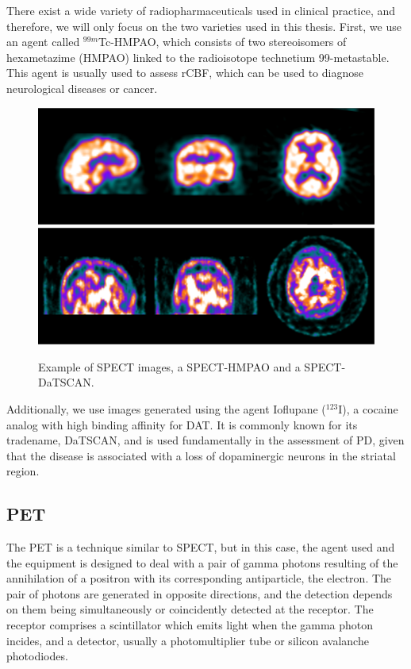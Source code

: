 There exist a wide variety of radiopharmaceuticals used in clinical practice, and therefore, we will only focus on the two varieties used in this thesis. First, we use an agent called $^{99m}$Tc-HMPAO, which consists of two stereoisomers of hexametazime (HMPAO) linked to the radioisotope technetium 99-metastable. This agent is usually used to assess \ac{rCBF}, which can be used to diagnose neurological diseases or cancer. 

\begin{figure}[p]
	\centering
	\includegraphics[width=0.8\linewidth]{Graphics/ch2/example_SPECT}\\
	\includegraphics[width=0.8\linewidth]{Graphics/ch2/example_DaTSCAN}
	\caption[Example of \acs{SPECT} images.]{Example of \acs{SPECT} images, a \acs{SPECT}-HMPAO and a \acs{SPECT}-DaTSCAN.}
	\label{fig:example_SPECT}
\end{figure}

Additionally, we use images generated using the agent Ioflupane ($^{123}$I), a cocaine analog with high binding affinity for \ac{DAT}. It is commonly known for its tradename, DaTSCAN, and is used fundamentally in the assessment of \ac{PD}, given that the disease is associated with a loss of dopaminergic neurons in the striatal region. 

\subsection{\acf{PET}}
The \acf{PET} is a technique similar to \ac{SPECT}, but in this case, the agent used and the equipment is designed to deal with a pair of gamma photons resulting of the annihilation of a positron with its corresponding antiparticle, the electron. The pair of photons are generated in opposite directions, and the detection depends on them being simultaneously or coincidently detected at the receptor. The receptor comprises a scintillator which emits light when the gamma photon incides, and a detector, usually a photomultiplier tube or silicon avalanche photodiodes.

